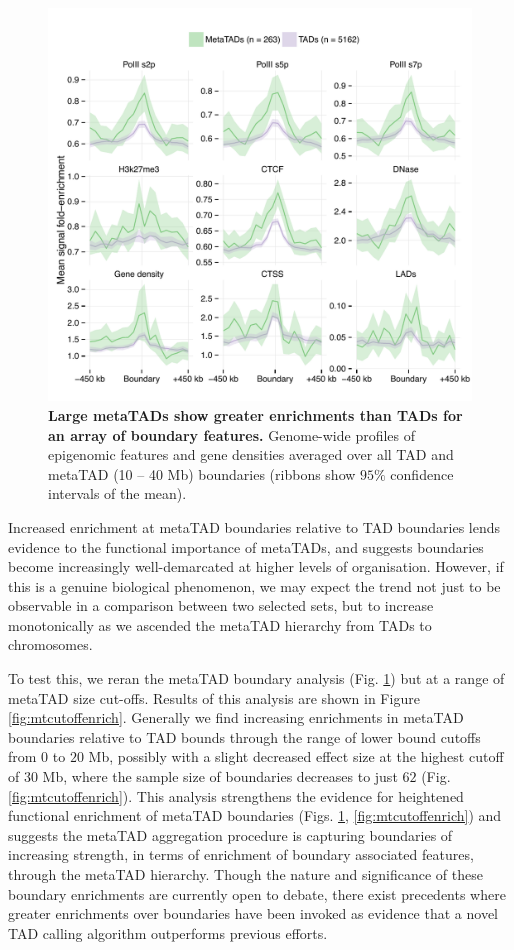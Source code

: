 \documentclass[a4paper,11pt,oneside]{book}
\begin{document}
\begin{figure}
\begin{center} 
\includegraphics[width=4.5in]{mt_feats.pdf}
\captionsetup{width=\textwidth}
\caption[Large metaTADs show greater enrichments than TADs for an array of boundary features.]{ {\bf Large metaTADs show greater enrichments than TADs for an array of boundary features.}
Genome-wide profiles of epigenomic features and gene densities averaged over all TAD and metaTAD (10 -- 40 Mb) boundaries (ribbons show $95\%$ confidence intervals of the mean).
}\label{fig:mtfeats}
\end{center}
\end{figure} 

Increased enrichment at metaTAD boundaries relative to TAD boundaries lends evidence to the functional importance of metaTADs, and suggests boundaries become increasingly well-demarcated at higher levels of organisation. However, if this is a genuine biological phenomenon, we may expect the trend not just to be observable in a comparison between two selected sets, but to increase monotonically as we ascended the metaTAD hierarchy from TADs to chromosomes.

To test this, we reran the metaTAD boundary analysis (Fig. \ref{fig:mtfeats}) but at a range of metaTAD size cut-offs. Results of this analysis are shown in Figure \ref{fig:mtcutoffenrich}. Generally we find increasing enrichments in metaTAD boundaries relative to TAD bounds through the range of lower bound cutoffs from $0$ to $20$ Mb, possibly with a slight decreased effect size at the highest cutoff of $30$ Mb, where the sample size of boundaries decreases to just $62$ (Fig. \ref{fig:mtcutoffenrich}). This analysis strengthens the evidence for heightened functional enrichment of metaTAD boundaries (Figs. \ref{fig:mtfeats}, \ref{fig:mtcutoffenrich}) and suggests the metaTAD aggregation procedure is capturing boundaries of increasing strength, in terms of enrichment of boundary associated features, through the metaTAD hierarchy. Though the nature and significance of these boundary enrichments are currently open to debate, there exist precedents where greater enrichments over boundaries have been invoked as evidence that a novel TAD calling algorithm outperforms previous efforts.\cite{Filippova2014, Weinreb2015}
\end{document}
